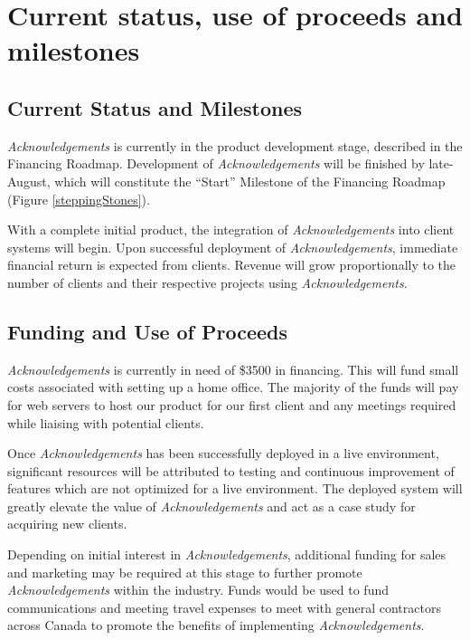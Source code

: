\section{Current status, use of proceeds and milestones}

\subsection{Current Status and Milestones}
{\it Acknowledgements} is currently in the product development stage, described in the Financing Roadmap. Development of {\it Acknowledgements} will be finished by late-August, which will constitute the ``Start'' Milestone of the Financing Roadmap (Figure \ref{steppingStones}). 

With a complete initial product, the integration of {\it Acknowledgements} into client systems will begin. Upon successful deployment of {\it Acknowledgements}, immediate financial return is expected from clients. Revenue will grow proportionally to the number of clients and their respective projects using {\it Acknowledgements}.

\subsection{Funding and Use of Proceeds}
{\it Acknowledgements} is currently in need of \$3500 in financing. This will fund small costs associated with setting up a home office. The majority of the funds will pay for web servers to host our product for our first client and any meetings required while liaising with potential clients.

Once {\it Acknowledgements} has been successfully deployed in a live environment, significant resources will be attributed to testing and continuous improvement of features which are not optimized for a live environment. The deployed system will greatly elevate the value of {\it Acknowledgements} and act as a case study for acquiring new clients. 

Depending on initial interest in {\it Acknowledgements}, additional funding for sales and marketing may be required at this stage to further promote {\it Acknowledgements} within the industry. Funds would be used to fund communications and meeting travel expenses to meet with general contractors across Canada to promote the benefits of implementing {\it Acknowledgements}.